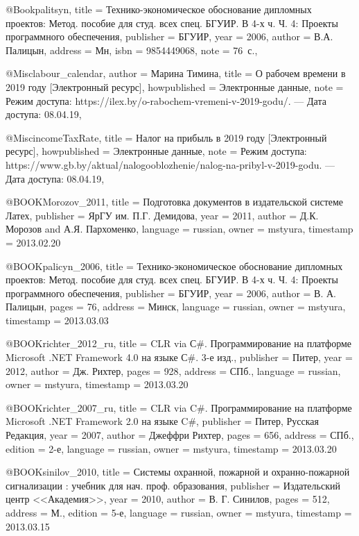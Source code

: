 @Book{palitsyn,
  title     = {Технико-экономическое обоснование дипломных проектов: Метод. пособие для студ. всех спец. БГУИР. В 4-х ч. Ч. 4: Проекты программного обеспечения},
  publisher = {БГУИР},
  year      = {2006},
  author    = {В.А. Палицын},
  address   = {Мн},
  isbn      = {9854449068},
  note      = {76~с.},
}

@Misc{labour_calendar,
  author       = {Марина Тимина},
  title        = {О рабочем времени в 2019 году [Электронный ресурс]},
  howpublished = {Электронные данные},
  note         = {Режим доступа: https://ilex.by/o-rabochem-vremeni-v-2019-godu/. --- Дата доступа: 08.04.19},
}

@Misc{incomeTaxRate,
  title        = {Налог на прибыль в 2019 году [Электронный ресурс]},
  howpublished = {Электронные данные},
  note         = {Режим доступа: https://www.gb.by/aktual/nalogooblozhenie/nalog-na-pribyl-v-2019-godu. --- Дата доступа: 08.04.19},
}

@BOOK{Morozov_2011,
  title = {Подготовка документов в издательской системе Латех},
  publisher = {ЯрГУ им. П.Г. Демидова},
  year = {2011},
  author = {Д.К. Морозов and А.Я. Пархоменко},
  language = {russian},
  owner = {mstyura},
  timestamp = {2013.02.20}
}

@BOOK{palicyn_2006,
  title = {Технико-экономическое обоснование дипломных проектов: Метод. пособие
	для студ. всех спец. БГУИР. В 4-х ч. Ч. 4: Проекты программного обеспечения},
  publisher = {БГУИР},
  year = {2006},
  author = {В. А. Палицын},
  pages = {76},
  address = {Минск},
  language = {russian},
  owner = {mstyura},
  timestamp = {2013.03.03}
}

@BOOK{richter_2012_ru,
  title = {CLR via С\#. Программирование на платформе Microsoft .NET Framework
	4.0 на языке С\#. 3-е изд.},
  publisher = {Питер},
  year = {2012},
  author = {Дж. Рихтер},
  pages = {928},
  address = {СПб.},
  language = {russian},
  owner = {mstyura},
  timestamp = {2013.03.20}
}

@BOOK{richter_2007_ru,
  title = {CLR via C\#. Программирование на платформе Microsoft .NET Framework
	2.0 на языке C\#},
  publisher = {Питер, Русская Редакция},
  year = {2007},
  author = {Джеффри Рихтер},
  pages = {656},
  address = {СПб.},
  edition = {2-е},
  language = {russian},
  owner = {mstyura},
  timestamp = {2013.03.20}
}

@BOOK{sinilov_2010,
  title = {Системы охранной, пожарной и охранно-пожарной сигнализации : учебник
	для нач. проф. образования},
  publisher = {Издательский центр <<Академия>>},
  year = {2010},
  author = {В. Г. Синилов},
  pages = {512},
  address = {М.},
  edition = {5-е},
  language = {russian},
  owner = {mstyura},
  timestamp = {2013.03.15}
}

